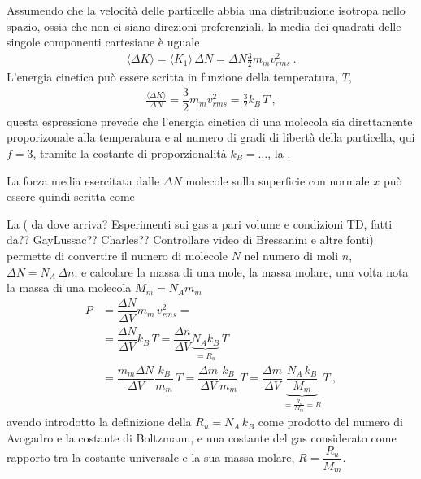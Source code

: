 \documentclass[letterpaper,10pt,italian]{jupyterBook}
\begin{document}
\sphinxAtStartPar
Assumendo che la velocità delle particelle abbia una distribuzione isotropa nello spazio, ossia che non ci siano direzioni preferenziali, la media dei quadrati delle singole componenti cartesiane è uguale
\begin{equation*}
\begin{split}\langle \Delta K \rangle = \langle K_1 \rangle \, \Delta N = \Delta N \frac{3}{2} m_m v_{rms}^2 \ .\end{split}
\end{equation*}
\sphinxAtStartPar
{} L’energia cinetica può essere scritta in funzione della temperatura, \(T\),
\begin{equation*}
\begin{split}\frac{\langle \Delta K \rangle}{\Delta N} = \dfrac{3}{2} m_m v^2_{rms} = \frac{3}{2} k_B \, T \ ,\end{split}
\end{equation*}
\sphinxAtStartPar
questa espressione prevede che l’energia cinetica di una molecola sia direttamente proporizonale alla temperatura e al numero di gradi di libertà della particella, qui \(f = 3\), tramite la costante di proporzionalità \(k_B = \dots\), la .

\sphinxAtStartPar
La forza media esercitata dalle \(\Delta N\) molecole sulla superficie con normale \(x\) può essere quindi scritta come

\sphinxAtStartPar
La  ( da dove arriva? Esperimenti sui gas a pari volume e condizioni TD, fatti da?? Gay\sphinxhyphen{}Lussac?? Charles?? Controllare video di Bressanini e altre fonti) permette di convertire il numero di molecole \(N\) nel numero di moli \(n\), \(\Delta N = N_A \, \Delta n\), e calcolare la massa di una mole, la massa molare, una volta nota la massa di una molecola \(M_m = N_A m_m\)
\begin{equation*}
\begin{split}P 
  & = \dfrac{\Delta N}{\Delta V} m_m \, v_{rms}^2 = \\  
  & = \dfrac{\Delta N}{\Delta V} k_B \, T
    = \dfrac{\Delta n}{\Delta V} \underbrace{N_A k_B}_{= R_u} \, T \\
  & = \dfrac{m_m \Delta N}{\Delta V} \dfrac{k_B}{m_m} \, T
    = \dfrac{\Delta m }{\Delta V} \dfrac{k_B}{m_m} \, T  
    = \dfrac{\Delta m }{\Delta V} \underbrace{\dfrac{N_A \, k_B}{M_m}}_{=\frac{R_u}{M_m} = R} \, T   \ , \end{split}
\end{equation*}
\sphinxAtStartPar
avendo introdotto la definizione della  \(R_u = N_A \, k_B\) come prodotto del numero di Avogadro e la costante di Boltzmann, e una costante del gas considerato come rapporto tra la costante universale e la sua massa molare, \(R = \dfrac{R_u}{M_m}\).
\end{document}

